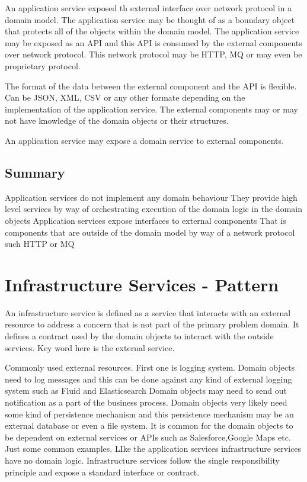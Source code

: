 \documentclass[a4paper, 11pt]{book}
\begin{document}
    An application service exposed th external interface over network protocol in a domain model.
    The application service may be thought of as a boundary object that protects all of the objects within the domain model.
    The application service may be exposed as an API and this API is consumed by the external components over network protocol.
    This network protocol may be HTTP, MQ or may even be proprietary protocol.

    The format of the data between the external component and the API is flexible.
    Can be JSON, XML, CSV or any other formate depending on the implementation of the application service.
    The external components may or may not have knowledge of the domain objects or their structures.

    An application service may expose a domain service to external components.

    \subsection{Summary}
    Application services do not implement any domain behaviour
    They provide high level services by way of orchestrating execution of the domain logic in the domain objects
    Application services expose interfaces to external components
    That is components that are outside of the domain model by way of a network protocol such HTTP or MQ

    \section{Infrastructure Services - Pattern}
    An infrastructure service is defined as a service that interacts with an external resource to address a concern that is not part of the primary problem domain.
    It defines a contract used by the domain objects to interact with the outside services.
    Key word here is the external service.

    Commonly used external resources.
    First one is logging system.
    Domain objects need to log messages and this can be done against any kind of external logging system such as Fluid and Elasticsearch
    Domain objects may need to send out notification as a part of the business process.
    Domain objects very likely need some kind of persistence mechanism and this persistence mechanism may be an external database or even a file system.
    It is common for the domain objects to be dependent on external services or APIs such as Salesforce,Google Maps etc. Just some common examples.
    LIke the application services infrastructure services have no domain logic.
    Infrastructure services follow the single responsibility principle and expose a standard interface or contract.
\end{document}
